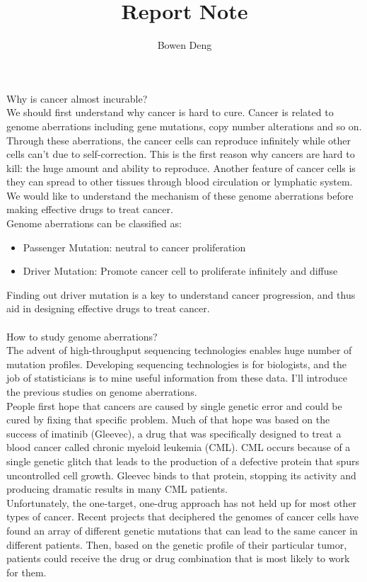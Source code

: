 \documentclass{article}
\title{Report Note}
\author{Bowen Deng}
\date{}
\begin{document}
\maketitle
Why is cancer almost incurable?\\
We should first understand why cancer is hard to cure. Cancer is related to genome aberrations including gene mutations, copy number alterations and so on. Through these aberrations, the cancer cells can reproduce infinitely while other cells can't due to self-correction. This is the first reason why cancers are hard to kill: the huge amount and ability to reproduce. Another feature of cancer cells is they can spread to other tissues through blood circulation or lymphatic system.\\
We would like to understand the mechanism of these genome aberrations before making effective drugs to treat cancer.\\
Genome aberrations can be classified as:\\
\begin{itemize}
\item Passenger Mutation: neutral to cancer proliferation\\
\item Driver Mutation: Promote cancer cell to proliferate infinitely and diffuse
\end{itemize}
Finding out driver mutation is a key to understand cancer progression, and thus aid in designing effective drugs to treat cancer.\\
\\
How to study genome aberrations?\\
The advent of high-throughput sequencing technologies enables huge number of mutation profiles. Developing sequencing technologies is for biologists, and the job of statisticians is to mine useful information from these data. I'll introduce the previous studies on genome aberrations.\\
People first hope that cancers are caused by single genetic error and could be cured by fixing that specific problem. Much of that hope was based on the success of imatinib (Gleevec), a drug that was specifically designed to treat a blood cancer called chronic myeloid leukemia (CML). CML occurs because of a single genetic glitch that leads to the production of a defective protein that spurs uncontrolled cell growth. Gleevec binds to that protein, stopping its activity and producing dramatic results in many CML patients.\\
Unfortunately, the one-target, one-drug approach has not held up for most other types of cancer. Recent projects that deciphered the genomes of cancer cells have found an array of different genetic mutations that can lead to the same cancer in different patients. Then, based on the genetic profile of their particular tumor, patients could receive the drug or drug combination that is most likely to work for them.\\
\end{document}
